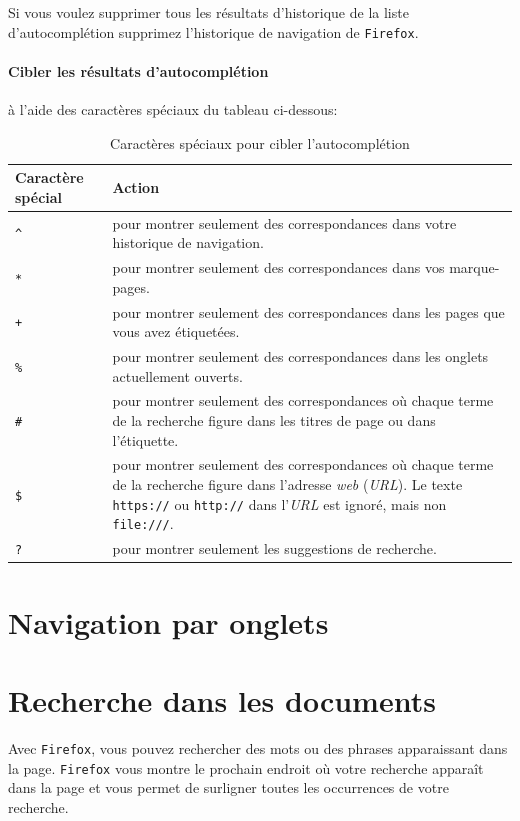 \documentclass[a4paper,11pt]{book}
\begin{document}
Si vous voulez supprimer tous les résultats d’historique de la liste d’autocomplétion supprimez l’historique de navigation de \texttt{Firefox}.
\medskip

\paragraph*{Cibler les résultats d'autocomplétion} à l'aide des caractères spéciaux du tableau ci-dessous:
\begin{table}[!h]
\begin{center}
\begin{tabular}{|p{3.5cm}|p{8.5cm}|}
\hline
\textbf{Caractère spécial} & \textbf{Action} \\
\hline
\texttt{\^} & pour montrer seulement des correspondances dans votre historique de navigation. \\
\hline
\texttt{*} & pour montrer seulement des correspondances dans vos marque-pages. \\
\hline
\texttt{+} & pour montrer seulement des correspondances dans les pages que vous avez étiquetées. \\
\hline
\texttt{\%} & pour montrer seulement des correspondances dans les onglets actuellement ouverts. \\
\hline
\texttt{\#} & pour montrer seulement des correspondances où chaque terme de la recherche figure dans les titres de page ou dans l’étiquette. \\
\hline
\texttt{\$} & pour montrer seulement des correspondances où chaque terme de la recherche figure dans l’adresse \textit{web} (\textit{URL}). Le texte \texttt{https://} ou \texttt{http://} dans l’\textit{URL} est ignoré, mais non \texttt{file:///}. \\
\hline
\texttt{?} & pour montrer seulement les suggestions de recherche. \\
\hline 
\end{tabular}
\caption{Caractères spéciaux pour cibler l'autocomplétion}
\end{center}
\end{table}
\medskip
 
\section{Navigation par onglets}
\section{Recherche dans les documents}
Avec \texttt{Firefox}, vous pouvez rechercher des mots ou des phrases apparaissant dans la page. \texttt{Firefox} vous montre le prochain endroit où votre recherche apparaît dans la page et vous permet de surligner toutes les occurrences de votre recherche.
\medskip
\end{document}
